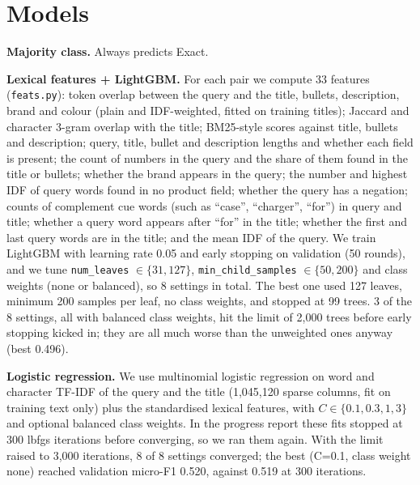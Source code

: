 \documentclass[11pt]{article}
\begin{document}
\section{Models}
\textbf{Majority class.} Always predicts Exact.

\textbf{Lexical features + LightGBM.} For each pair we compute 33 features (\texttt{feats.py}): token overlap between the query and the title, bullets, description, brand and colour (plain and IDF-weighted, fitted on training titles); Jaccard and character 3-gram overlap with the title; BM25-style scores \cite{robertson2009} against title, bullets and description; query, title, bullet and description lengths and whether each field is present; the count of numbers in the query and the share of them found in the title or bullets; whether the brand appears in the query; the number and highest IDF of query words found in no product field; whether the query has a negation; counts of complement cue words (such as ``case'', ``charger'', ``for'') in query and title; whether a query word appears after ``for'' in the title; whether the first and last query words are in the title; and the mean IDF of the query.
We train LightGBM \cite{ke2017} with learning rate 0.05 and early stopping on validation (50 rounds), and we tune \texttt{num\_leaves} $\in\{31,127\}$, \texttt{min\_child\_samples} $\in\{50,200\}$ and class weights (none or balanced), so 8 settings in total.
The best one used 127 leaves, minimum 200 samples per leaf, no class weights, and stopped at 99 trees. 3 of the 8 settings, all with balanced class weights, hit the limit of 2,000 trees before early stopping kicked in; they are all much worse than the unweighted ones anyway (best 0.496).

\textbf{Logistic regression.} We use multinomial logistic regression \cite{pedregosa2011} on word and character TF-IDF of the query and the title (1{,}045{,}120 sparse columns, fit on training text only) plus the standardised lexical features, with $C\in\{0.1,0.3,1,3\}$ and optional balanced class weights.
In the progress report these fits stopped at 300 lbfgs iterations before converging, so we ran them again. With the limit raised to 3{,}000 iterations, 8 of 8 settings converged; the best (C=0.1, class weight none) reached validation micro-F1 0.520, against 0.519 at 300 iterations.
\end{document}
